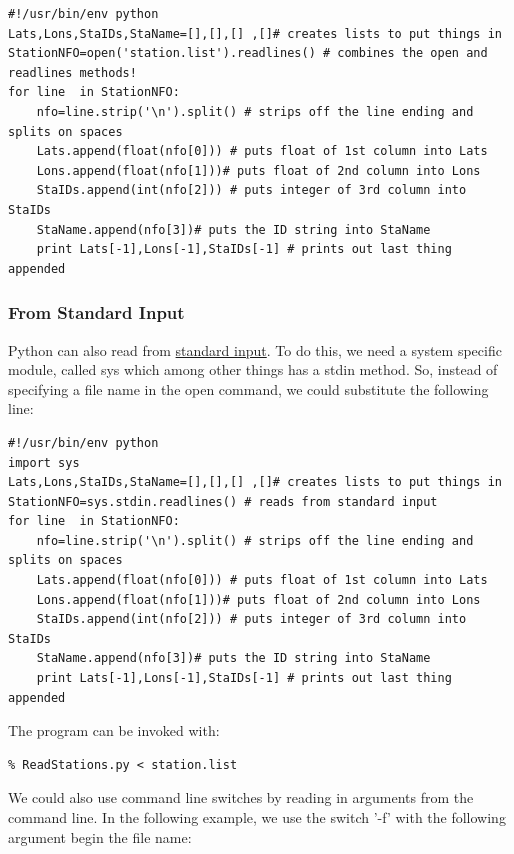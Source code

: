 \documentclass[11pt]{book}
\begin{document}
{{{{ \color{blue} \begin{verbatim}
#!/usr/bin/env python
Lats,Lons,StaIDs,StaName=[],[],[] ,[]# creates lists to put things in
StationNFO=open('station.list').readlines() # combines the open and readlines methods!
for line  in StationNFO:
    nfo=line.strip('\n').split() # strips off the line ending and splits on spaces
    Lats.append(float(nfo[0])) # puts float of 1st column into Lats
    Lons.append(float(nfo[1]))# puts float of 2nd column into Lons
    StaIDs.append(int(nfo[2])) # puts integer of 3rd column into StaIDs
    StaName.append(nfo[3])# puts the ID string into StaName
    print Lats[-1],Lons[-1],StaIDs[-1] # prints out last thing appended
\end{verbatim}}

 \subsubsection{From  Standard Input }

Python can also read from \href{#standard_IO}{standard input}.  To do this, we need a system specific module, called {\color{blue}sys} which among other things has a {\color{blue}stdin} method.  So, instead of specifying a file name in the {\color{blue}open} command, we could substitute the following line:


{ \color{blue} \begin{verbatim}
#!/usr/bin/env python
import sys
Lats,Lons,StaIDs,StaName=[],[],[] ,[]# creates lists to put things in
StationNFO=sys.stdin.readlines() # reads from standard input
for line  in StationNFO:
    nfo=line.strip('\n').split() # strips off the line ending and splits on spaces
    Lats.append(float(nfo[0])) # puts float of 1st column into Lats
    Lons.append(float(nfo[1]))# puts float of 2nd column into Lons
    StaIDs.append(int(nfo[2])) # puts integer of 3rd column into StaIDs
    StaName.append(nfo[3])# puts the ID string into StaName
    print Lats[-1],Lons[-1],StaIDs[-1] # prints out last thing appended
\end{verbatim}}

\noindent The program can be invoked with:

{\color{blue}\begin{verbatim}
% ReadStations.py < station.list
\end{verbatim}}

We could also use command line switches by reading in arguments from the command line.  In the following example, we use the switch '-f' with the following argument begin the file name: 
 
}}}
\end{document}
